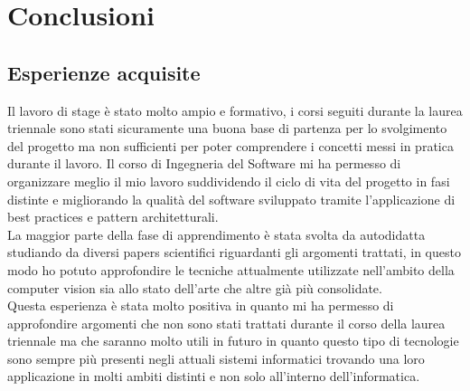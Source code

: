 \section{Conclusioni}

\subsection{Esperienze acquisite}
Il lavoro di stage è stato molto ampio e formativo, i corsi seguiti durante la laurea triennale sono stati sicuramente una buona base di partenza per lo svolgimento del progetto ma non sufficienti per poter comprendere i concetti messi in pratica durante il lavoro. Il corso di Ingegneria del Software mi ha permesso di organizzare meglio il mio lavoro suddividendo il ciclo di vita del progetto in fasi distinte e migliorando la qualità del software sviluppato tramite l'applicazione di best practices e pattern architetturali.\\
La maggior parte della fase di apprendimento è stata svolta da autodidatta studiando da diversi papers scientifici riguardanti gli argomenti trattati, in questo modo ho potuto approfondire le tecniche attualmente utilizzate nell'ambito della computer vision sia allo stato dell'arte che altre già più consolidate.\\
Questa esperienza è stata molto positiva in quanto mi ha permesso di approfondire argomenti che non sono stati trattati durante il corso della laurea triennale ma che saranno molto utili in futuro in quanto questo tipo di tecnologie sono sempre più presenti negli attuali sistemi informatici trovando una loro applicazione in molti ambiti distinti e non solo all'interno dell'informatica.

